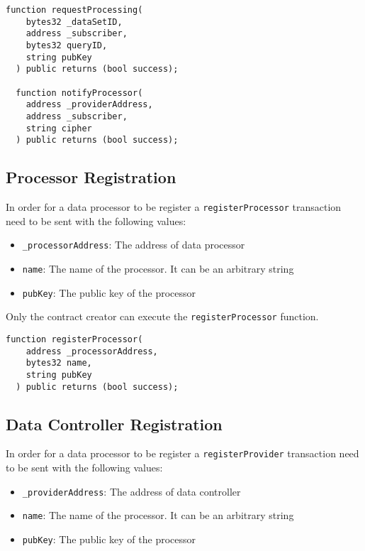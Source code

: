 \begin{lstlisting}[language=Solidity, caption={Request for processing functions}]
  function requestProcessing(
    bytes32 _dataSetID,
    address _subscriber,
    bytes32 queryID,
    string pubKey
  ) public returns (bool success);

  function notifyProcessor(
    address _providerAddress,
    address _subscriber,
    string cipher
  ) public returns (bool success);

\end{lstlisting}

\subsection{Processor Registration}
\label{implemenation:contracts:reg_processor}

In order for a data processor to be register a \verb|registerProcessor| transaction need to be sent with the following values:

\begin{itemize}
  \item \verb|_processorAddress|: The address of data processor
  \item \verb|name|: The name of the processor. It can be an arbitrary string
  \item \verb|pubKey|: The public key of the processor
\end{itemize}

Only the contract creator can execute the \verb|registerProcessor| function.

\begin{lstlisting}[language=Solidity, caption={Data processor registration function}]
  function registerProcessor(
    address _processorAddress,
    bytes32 name,
    string pubKey
  ) public returns (bool success);
\end{lstlisting}

\subsection{Data Controller Registration}
\label{implemenation:contracts:reg_processor}

In order for a data processor to be register a \verb|registerProvider| transaction need to be sent with the following values:

\begin{itemize}
  \item \verb|_providerAddress|: The address of data controller
  \item \verb|name|: The name of the processor. It can be an arbitrary string
  \item \verb|pubKey|: The public key of the processor
\end{itemize}

